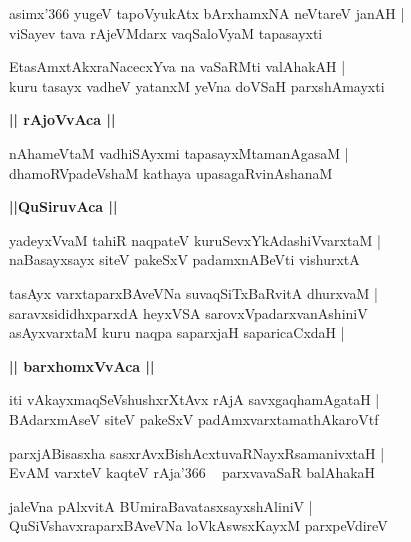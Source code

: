 \documentclass[twoside,12pt,openright]{book}
\newcounter{shloka}[chapter]
\def\uvaca#1{\centerline{{\large\textbf{#1}}}}
\begin{document}
\begin{shloka}%
asimx\char'366 yugeV tapoVyukAtx bArxhamxNA neVtareV janAH |\\
viSayev tava rAjeVMdarx vaqSaloVyaM tapasayxti
\end{shloka}

\begin{shloka}%
EtasAmxtAkxraNacecxYva na vaSaRMti valAhakAH |\\
kuru tasayx vadheV yatanxM yeVna doVSaH parxshAmayxti
\end{shloka}

\uvaca{|| rAjoVvAca ||}

\begin{shloka}%
nAhameVtaM vadhiSAyxmi tapasayxMtamanAgasaM |\\
dhamoRVpadeVshaM kathaya upasagaRvinAshanaM
\end{shloka}

\uvaca{||QuSiruvAca ||}

\begin{shloka}%
yadeyxVvaM tahiR naqpateV kuruSevxYkAdashiVvarxtaM |\\
naBasayxsayx siteV pakeSxV padamxnABeVti vishurxtA
\end{shloka}

\begin{shloka}%
tasAyx varxtaparxBAveVNa suvaqSiTxBaRvitA dhurxvaM |\\
saravxsididhxparxdA heyxVSA sarovxVpadarxvanAshiniV \\
asAyxvarxtaM kuru naqpa saparxjaH saparicaCxdaH |\\
\end{shloka}

\uvaca{|| barxhomxVvAca ||}

\begin{shloka}%
iti vAkayxmaqSeVshushxrXtAvx rAjA savxgaqhamAgataH |\\
BAdarxmAseV siteV pakeSxV padAmxvarxtamathAkaroVtf 
\end{shloka}

\begin{shloka}%
parxjABisasxha sasxrAvxBishAcxtuvaRNayxRsamanivxtaH |\\
EvAM varxteV kaqteV rAja\char'366 ~ parxvavaSaR balAhakaH 
\end{shloka}

\begin{shloka}%
jaleVna pAlxvitA BUmiraBavatasxsayxshAliniV |\\
QuSiVshavxraparxBAveVNa loVkAswsxKayxM parxpeVdireV 
\end{shloka}
\end{document}
